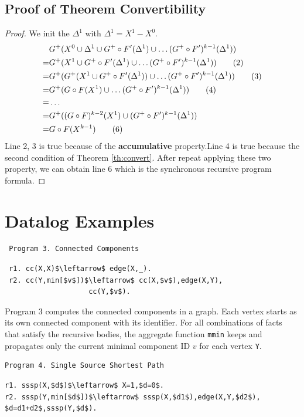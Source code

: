 \begin{appendix}
 \subsection{Proof of Theorem Convertibility}
 \label{sec:app:proof:convert}
\begin{proof}
We init the $\Delta^1$ with $\Delta^1=X^1-X^0$.
\begin{align}
&G^+(X^0\cup \Delta^1 \cup G^+\circ F'(\Delta^1)\cup \ldots (G^+ \circ F')^{k-1}(\Delta^1 )) \notag\\
=&G^+(X^1 \cup G^+\circ F'(\Delta^1  )\cup \ldots (G^+ \circ F')^{k-1}(\Delta^1  )) \tag{2}\\
=&G^+(G^+(X^1\cup G^+\circ F'(\Delta^1  ))\cup \ldots (G^+ \circ F')^{k-1}(\Delta^1 )) \tag{3}\\
=&G^+(G\circ F(X^1)\cup \ldots (G^+ \circ F')^{k-1}(\Delta^1 )) \tag{4}\\
=&\ldots \notag\\
=&G^+((G\circ F)^{k-2}(X^1)\cup(G^+ \circ F')^{k-1}(\Delta^1 )) \notag\\
=&G\circ F(X^{k-1})\tag{6}
\end{align}
Line 2, 3 is true because of the \textbf{accumulative} property.Line 4 is true because the second condition of Theorem \ref{th:convert}. After repeat applying these two property, we can obtain line 6 which is the synchronous recursive program formula.
\end{proof}
 

 \section{Datalog Examples}
 \label{sec:app:example}
 \begin{verbatim}
 Program 3. Connected Components
 \end{verbatim}\vspace{-0.1in}\small
 \begin{lstlisting}
 r1. cc(X,X)$\leftarrow$ edge(X,_).
 r2. cc(Y,min[$v$])$\leftarrow$ cc(X,$v$),edge(X,Y),
                    cc(Y,$v$).
 \end{lstlisting}
 \normalsize
 
 Program 3 computes the connected components in a graph. Each vertex starts as its own connected component with its identifier. For all combinations of facts that satisfy the recursive bodies, the aggregate function \texttt{mmin} keeps and propagates only the current minimal component ID $v$ for each vertex \texttt{Y}.
 
\begin{verbatim}
Program 4. Single Source Shortest Path
\end{verbatim}
\vspace{-0.1in}
\small
\begin{lstlisting}
r1. sssp(X,$d$)$\leftarrow$ X=1,$d=0$.
r2. sssp(Y,min[$d$])$\leftarrow$ sssp(X,$d1$),edge(X,Y,$d2$),
$d=d1+d2$,sssp(Y,$d$).
\end{lstlisting}
\normalsize


\end{appendix}
